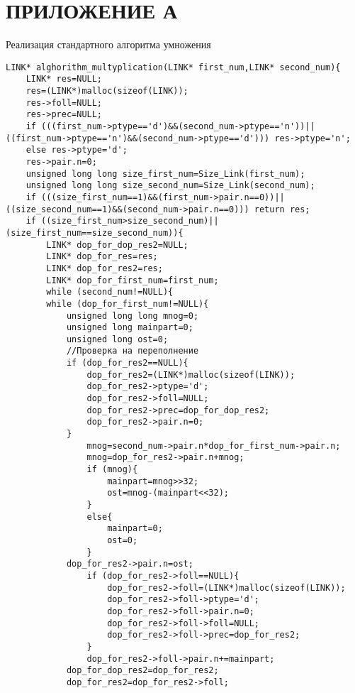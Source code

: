 \documentclass[14pt, russian]{scrartcl}
\newcommand{\anonsection}[1]{\cleardoublepage
\phantomsection
\addcontentsline{toc}{section}{\protect\numberline{}#1}
\section*{#1}\vspace*{2.5ex} %
}
\begin{document}
\anonsection{ПРИЛОЖЕНИЕ А}
\vspace{-20pt}
\begin{code}
\caption{Реализация стандартного алгоритма умножения}
\vspace{10pt}
\label{lst:mul2octal}
\begin{verbatim}
LINK* alghorithm_multyplication(LINK* first_num,LINK* second_num){
    LINK* res=NULL;
    res=(LINK*)malloc(sizeof(LINK));
    res->foll=NULL;
    res->prec=NULL;
    if (((first_num->ptype=='d')&&(second_num->ptype=='n'))||((first_num->ptype=='n')&&(second_num->ptype=='d'))) res->ptype='n';
    else res->ptype='d';
    res->pair.n=0;
    unsigned long long size_first_num=Size_Link(first_num);
    unsigned long long size_second_num=Size_Link(second_num);
    if (((size_first_num==1)&&(first_num->pair.n==0))||((size_second_num==1)&&(second_num->pair.n==0))) return res;
    if ((size_first_num>size_second_num)||(size_first_num==size_second_num)){
        LINK* dop_for_dop_res2=NULL;
        LINK* dop_for_res=res;
        LINK* dop_for_res2=res;
        LINK* dop_for_first_num=first_num;
        while (second_num!=NULL){
        while (dop_for_first_num!=NULL){
            unsigned long long mnog=0;
            unsigned long mainpart=0;
            unsigned long ost=0;
            //Проверка на переполнение
            if (dop_for_res2==NULL){
                dop_for_res2=(LINK*)malloc(sizeof(LINK));
                dop_for_res2->ptype='d';
                dop_for_res2->foll=NULL;
                dop_for_res2->prec=dop_for_dop_res2;
                dop_for_res2->pair.n=0;
            }
                mnog=second_num->pair.n*dop_for_first_num->pair.n;
                mnog=dop_for_res2->pair.n+mnog;
                if (mnog){
                    mainpart=mnog>>32;
                    ost=mnog-(mainpart<<32);
                }
                else{
                    mainpart=0;
                    ost=0;
                }
            dop_for_res2->pair.n=ost;
                if (dop_for_res2->foll==NULL){
                    dop_for_res2->foll=(LINK*)malloc(sizeof(LINK));
                    dop_for_res2->foll->ptype='d';
                    dop_for_res2->foll->pair.n=0;
                    dop_for_res2->foll->foll=NULL;
                    dop_for_res2->foll->prec=dop_for_res2;
                }
                dop_for_res2->foll->pair.n+=mainpart;
            dop_for_dop_res2=dop_for_res2;
            dop_for_res2=dop_for_res2->foll;

\end{verbatim}
\end{code}
\end{document}
